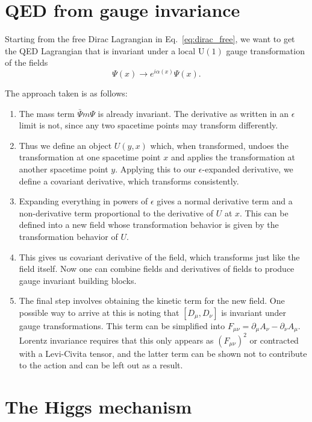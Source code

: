 \documentclass[12pt]{memoir}
\begin{document}
\section{QED from gauge invariance}

Starting from the free Dirac Lagrangian in Eq.~\ref{eq:dirac_free},
we want to get the QED Lagrangian
that is invariant under a local $\text{U}(1)$ gauge transformation of the fields
\begin{equation}
  \Psi(x) \rightarrow e^{i \alpha(x)}\Psi(x).
\end{equation}

The approach taken is as follows:
\begin{enumerate}
  \item The mass term $\bar{\Psi}m\Psi$ is already invariant.
    The derivative as written in an $\epsilon$ limit is not,
    since any two spacetime points may transform differently.
  \item Thus we define an object $U(y, x)$
    which, when transformed,
    undoes the transformation at one spacetime point $x$
    and applies the transformation at another spacetime point $y$.
    Applying this to our $\epsilon$-expanded derivative, we define a covariant derivative,
    which transforms consistently.
  \item Expanding everything in powers of $\epsilon$ gives a normal derivative term
    and a non-derivative term proportional to the derivative of $U$ at $x$.
    This can be defined into a new field whose transformation behavior is given by the transformation behavior of $U$.
  \item This gives us covariant derivative of the field, which transforms just like the field itself.
    Now one can combine fields and derivatives of fields to produce gauge invariant building blocks.
  \item The final step involves obtaining the kinetic term for the new field.
    One possible way to arrive at this is noting that $[D_{\mu}, D_{\nu}]$ is invariant under gauge transformations.
    This term can be simplified into $F_{\mu\nu}=\partial_{\mu}A_{\nu} - \partial_{\nu}A_{\mu}$.
    Lorentz invariance requires that this only appears as $(F_{\mu\nu})^2$ or contracted with a Levi-Civita tensor,
    and the latter term can be shown not to contribute to the action and can be left out as a result.
\end{enumerate}

\section{The Higgs mechanism}
\end{document}
